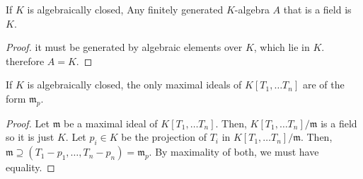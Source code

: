 \begin{corollary}
    If $K$ is algebraically closed,
    Any finitely generated $K$-algebra $A$ that is a field is $K$.

    \begin{proof} it must be
    generated by algebraic elements over $K$,
    which lie in $K$.
    therefore $A = K$.
    \end{proof}
\end{corollary}

\begin{corollary}
    If $K$ is algebraically closed,
    the only maximal ideals of $K[T_1, \ldots T_n]$ are of the form $\mathfrak{m}_p$.
    \begin{proof}
        Let $\mathfrak{m}$ be a maximal ideal of $K[T_1, \ldots T_n]$.
        Then, $K[T_1, \ldots T_n]/\mathfrak{m}$ is a field so it is just $K$.
        Let $p_i \in K$ be the projection of $T_i$ in $K[T_1, \ldots T_n]/\mathfrak{m}$.
        Then, $\mathfrak{m} \supseteq (T_1 - p_1, \ldots, T_n - p_n) = \mathfrak{m}_p$.
        By maximality of both, we must have equality.
    \end{proof}
\end{corollary}

